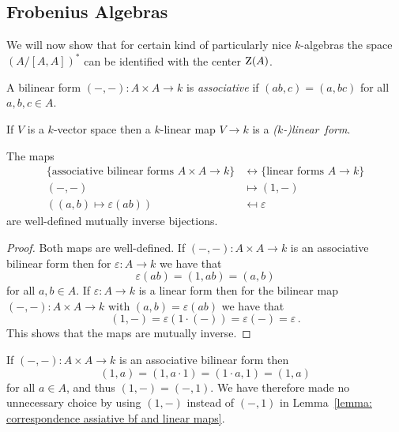 \subsection{Frobenius Algebras}


\begin{fluff}
  We will now show that for certain kind of particularly nice $k$-algebras the space $(A/[A,A])^*$ can be identified with the center $\operatorname{Z}(A)$.
\end{fluff}


\begin{definition}
  A bilinear form $(-,-) \colon A \times A \to k$ is \emph{associative} if $(ab,c) = (a,bc)$ for all $a, b, c \in A$.
\end{definition}


\begin{recall}
  If $V$ is a $k$-vector space then a $k$-linear map $V \to k$ is a \emph{\textup($k$-\textup)linear~form}.
\end{recall}


\begin{lemma}
  \label{lemma: correspondence assiative bf and linear maps}
  The maps
  \begin{align*}
    \{ \text{associative bilinear forms $A \times A \to k$} \}
    &\longleftrightarrow
    \{ \text{linear forms $A \to k$} \}
    \\
    (-,-)
    &\longmapsto
    (1,-)
    \\
    ((a,b) \mapsto \varepsilon(ab))
    &\mapsfrom
    \varepsilon
  \end{align*}
  are well-defined mutually inverse bijections.
\end{lemma}


\begin{proof}
  Both maps are well-defined.
  If $(-,-) \colon A \times A \to k$ is an associative bilinear form then for $\varepsilon \colon A \to k$ we have that
  \[
      \varepsilon(ab)
    = (1,ab)
    = (a,b)
  \]
  for all $a, b \in A$.
  If $\varepsilon \colon A \to k$ is a linear form then for the bilinear map $(-,-) \colon A \times A \to k$ with $(a,b) = \varepsilon(ab)$ we have that
  \[
      (1,-)
    = \varepsilon(1 \cdot (-))
    = \varepsilon(-)
    = \varepsilon \,.
  \]
  This shows that the maps are mutually inverse.
\end{proof}


\begin{remark}
  If $(-,-) \colon A \times A \to k$ is an associative bilinear form then
  \[
      (1,a)
    = (1, a \cdot 1)
    = (1 \cdot a, 1)
    = (1, a)
  \]
  for all $a \in A$, and thus $(1,-) = (-,1)$.
  We have therefore made no unnecessary choice by using $(1,-)$ instead of $(-,1)$ in Lemma~\ref{lemma: correspondence assiative bf and linear maps}.
\end{remark}



